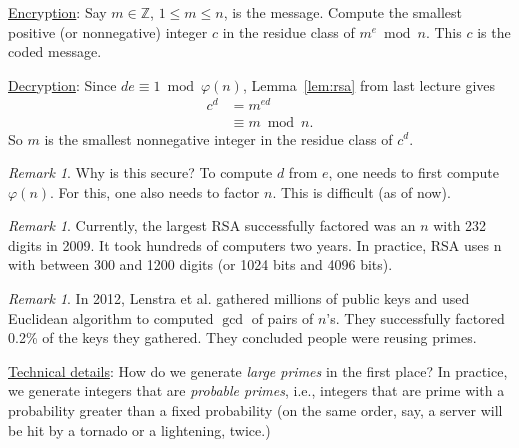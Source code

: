 \documentclass{amsbook}
\theoremstyle{plain}
\theoremstyle{definition}
\theoremstyle{remark}
\newtheorem{remark}[theorem]{Remark}
\numberwithin{equation}{chapter}
\numberwithin{figure}{chapter}
\newcommand{\Z}{\mathbb{Z}}
\begin{document}
\underline{Encr}yp\underline{tion}: Say $m \in \Z$, $1 \leqslant m \leqslant n$, is the message. Compute the smallest positive (or nonnegative) integer $c$ in the residue class of $m^e \bmod n$. This $c$ is the coded message.

\underline{Decr}yp\underline{tion}: Since $de \equiv 1 \bmod \varphi(n)$, Lemma~\ref{lem:rsa} from last lecture gives
\begin{align}
  c^d &= m^{ed} \\
      &\equiv m \bmod n.
\end{align}
So $m$ is the smallest nonnegative integer in the residue class of $c^d$.
\begin{remark}
  Why is this secure? To compute $d$ from $e$, one needs to first compute $\varphi(n)$. For this, one also needs to factor $n$. This is difficult (as of now). 
\end{remark}
\begin{remark}
  Currently, the largest RSA successfully factored was an $n$ with 232 digits in 2009. It took hundreds of computers two years. In practice, RSA uses n with between 300 and 1200 digits (or 1024 bits and 4096 bits).
\end{remark}
\begin{remark}
  In 2012, Lenstra et al. gathered millions of public keys and used Euclidean algorithm to computed $\gcd$ of pairs of $n$'s. They successfully factored 0.2\% of the keys they gathered. They concluded people were reusing primes.
\end{remark}

\underline{Technical details}: How do we generate \emph{large primes} in the first place? In practice, we generate integers that are \emph{probable primes}, i.e., integers that are prime with a probability greater than a fixed probability (on the same order, say, a server will be hit by a tornado or a lightening, twice.)
\end{document}
